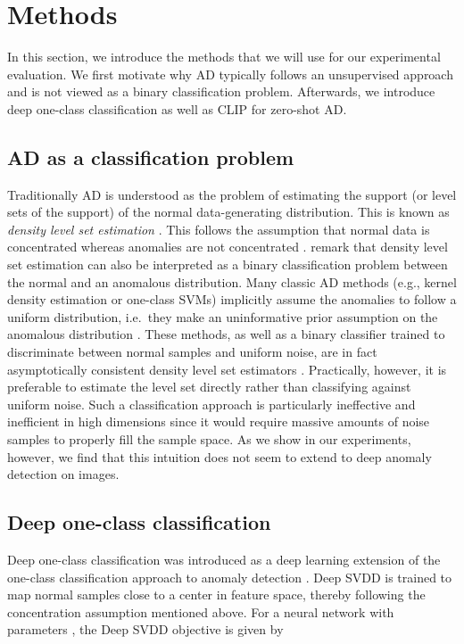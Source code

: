 \documentclass[10pt]{article} \usepackage[accepted]{stylefiles/tmlr}
\begin{document}
\section{Methods}
In this section, we introduce the methods that we will use for our experimental evaluation. 
We first motivate why AD typically follows an unsupervised approach and is not viewed as a binary classification problem. Afterwards, we introduce deep one-class classification as well as CLIP \citep{radford2021learning} for zero-shot AD.

\subsection{AD as a classification problem}
Traditionally AD is understood as the problem of estimating the support (or level sets of the support) of the normal data-generating distribution. 
This is known as \emph{density level set estimation} \citep{polonik1995measuring,tsybakov1997}. 
This follows the assumption that normal data is concentrated whereas anomalies are not concentrated \citep{scholkopf2002}. 
\citet{steinwart2005classification} remark that density level set estimation can also be interpreted as a binary classification problem between the normal and an anomalous distribution. 
Many classic AD methods (e.g., kernel density estimation or one-class SVMs) implicitly assume the anomalies to follow a uniform distribution, i.e.~they make an uninformative prior assumption on the anomalous distribution \citep{steinwart2005classification}. 
These methods, as well as a binary classifier trained to discriminate between normal samples and uniform noise, are in fact asymptotically consistent density level set estimators \citep{steinwart2005classification,vert2006}. 
Practically, however, it is preferable to estimate the level set directly rather than classifying against uniform noise. 
Such a classification approach is particularly ineffective and inefficient in high dimensions since it would require massive amounts of noise samples to properly fill the sample space. 
As we show in our experiments, however, we find that this intuition does not seem to extend to deep anomaly detection on images.



\subsection{Deep one-class classification}
\label{sec:hypsphcla}
Deep one-class classification \citep{ruff2018deep} was introduced as a deep learning extension of the one-class classification approach to anomaly detection \citep{scholkopf2001,tax2001}.
Deep SVDD \citep{ruff2018deep} is trained to map normal samples close to a center  in feature space, thereby following the concentration assumption \citep{scholkopf2002} mentioned above.
For a neural network  with parameters , the Deep SVDD objective is given by
\end{document}
